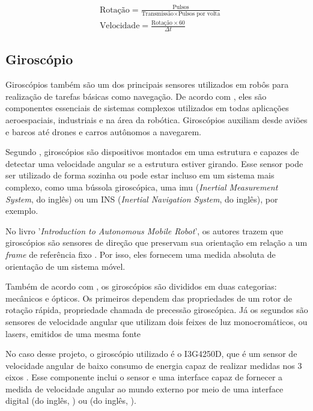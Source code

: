 \documentclass[acronym, symbols, table]{fei}
\begin{document}
				\begin{equation}\label{eq:velocidade_roda_encoder}
					\begin{split}
						&\text{Rotação} = \frac{\text{Pulsos}}{\text{Transmissão} \times \text{Pulsos por volta}} \\
						&\text{Velocidade} = \frac{\text{Rotação} \times 60}{\Delta t}
					\end{split}
				\end{equation}
			
			\subsection{Giroscópio} \label{sec:sensores_giroscopio}
			
				Giroscópios também são um dos principais sensores utilizados em robôs para realização de tarefas básicas como navegação. De acordo com \textcite{jeremydingman2020}, eles são componentes essenciais de sistemas complexos utilizados em todas aplicações aeroespaciais, industriais e na área da robótica. Giroscópios auxiliam desde aviões e barcos até drones e carros autônomos a navegarem.
				
				Segundo \textcite{s17102284}, giroscópios são dispositivos montados em uma estrutura e capazes de detectar uma velocidade angular se a estrutura estiver girando. Esse sensor pode ser utilizado de forma sozinha ou pode estar incluso em um sistema mais complexo, como uma bússola giroscópica, uma \acrshort{imu} (\textit{Inertial Measurement System}, do inglês) ou um INS (\textit{Inertial Navigation System}, do inglês), por exemplo.
				
				No livro '\textit{Introduction to Autonomous Mobile Robot}', os autores trazem que giroscópios são sensores de direção que preservam sua orientação em relação a um \textit{frame} de referência fixo \cite{siegwart2011introduction}. Por isso, eles fornecem uma medida absoluta de orientação de um sistema móvel. 
				
				Também de acordo com \textcite{siegwart2011introduction}, os giroscópios são divididos em duas categorias: mecânicos e ópticos. Os primeiros dependem das propriedades de um rotor de rotação rápida, propriedade chamada de precessão giroscópica. Já os segundos são sensores de velocidade angular que utilizam dois feixes de luz monocromáticos, ou lasers, emitidos de uma mesma fonte
				
				No caso desse projeto, o giroscópio utilizado é o I3G4250D, que é um sensor de velocidade angular de baixo consumo de energia capaz de realizar medidas nos 3 eixos \cite{datasheet_gyro}. Esse componente inclui o sensor e uma interface capaz de fornecer a medida de velocidade angular ao mundo externo por meio de uma interface digital  (do inglês, ) ou  (do inglês, ).
			
\end{document}

